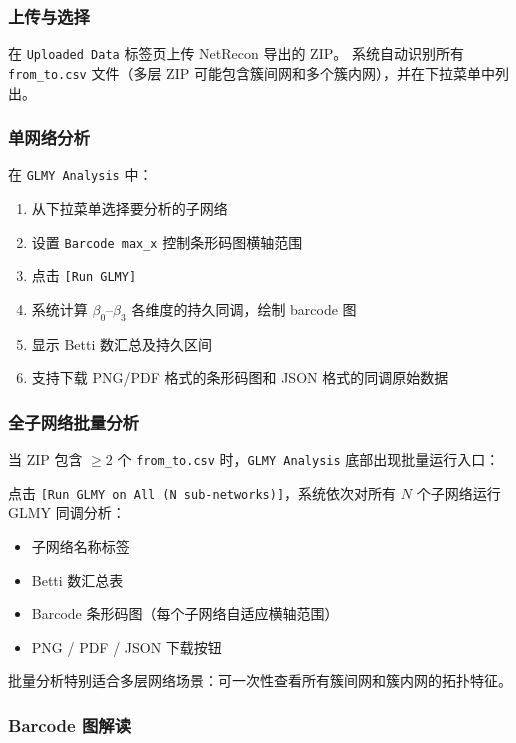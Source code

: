 \documentclass[12pt,a4paper]{ctexart}
\newcommand{\btn}[1]{\texttt{[#1]}}
\newcommand{\tab}[1]{\texttt{#1}}
\newcommand{\file}[1]{\texttt{#1}}
\newcommand{\param}[1]{\texttt{#1}}
\begin{document}
\subsubsection{上传与选择}

在 \tab{Uploaded Data} 标签页上传 NetRecon 导出的 ZIP。
系统自动识别所有 \file{from\_to.csv} 文件（多层 ZIP 可能包含簇间网和多个簇内网），并在下拉菜单中列出。

\subsubsection{单网络分析}

在 \tab{GLMY Analysis} 中：
\begin{enumerate}[leftmargin=*]
    \item 从下拉菜单选择要分析的子网络
    \item 设置 \param{Barcode max\_x} 控制条形码图横轴范围
    \item 点击 \btn{Run GLMY}
    \item 系统计算 $\beta_0$--$\beta_3$ 各维度的持久同调，绘制 barcode 图
    \item 显示 Betti 数汇总及持久区间
    \item 支持下载 PNG/PDF 格式的条形码图和 JSON 格式的同调原始数据
\end{enumerate}

\subsubsection{全子网络批量分析}

当 ZIP 包含 $\geq 2$ 个 \file{from\_to.csv} 时，\tab{GLMY Analysis} 底部出现批量运行入口：

\begin{stepbox}[批量运行]
    点击 \btn{Run GLMY on All (N sub-networks)}，系统依次对所有 $N$ 个子网络运行 GLMY 同调分析：
    \begin{itemize}[leftmargin=*]
        \item 子网络名称标签
        \item Betti 数汇总表
        \item Barcode 条形码图（每个子网络自适应横轴范围）
        \item PNG / PDF / JSON 下载按钮
    \end{itemize}
    批量分析特别适合多层网络场景：可一次性查看所有簇间网和簇内网的拓扑特征。
\end{stepbox}

\subsubsection{Barcode 图解读}
\end{document}
